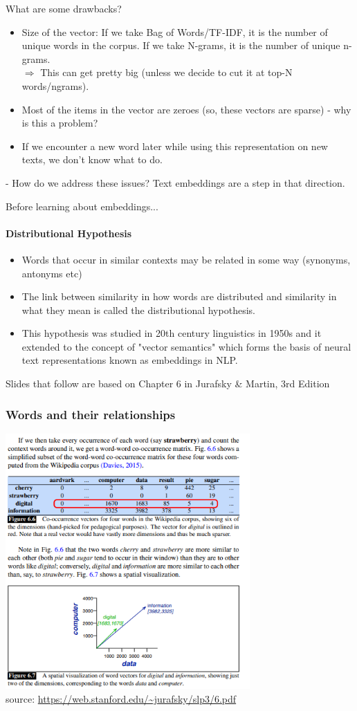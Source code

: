 \documentclass{beamer}
\begin{document}
\begin{frame}{What are some drawbacks?}
    \begin{itemize}
        \item Size of the vector: If we take Bag of Words/TF-IDF, it is the number of unique words in the corpus. If we take N-grams, it is the number of unique n-grams. 
        \\ $\Rightarrow$ This can get pretty big (unless we decide to cut it at top-N words/ngrams).
        \item Most of the items in the vector are zeroes (so, these vectors are sparse) - why is this a problem? \pause
        \item If we encounter a new word later while using this representation on new texts, we don't know what to do. \pause
    \end{itemize}
    -  How do we address these issues? \pause Text embeddings are a step in that direction. 
\end{frame}

\begin{frame}{Before learning about embeddings...}
\framesubtitle{Distributional Hypothesis}
    \begin{itemize}
        \item Words that occur in similar contexts may be related in some way (synonyms, antonyms etc)
        \item The link between similarity in how words are distributed and similarity
in what they mean is called the distributional hypothesis.
\item This hypothesis was studied in 20th century linguistics in 1950s and it extended to the concept of "vector semantics" which forms the basis of neural text representations known as embeddings in NLP. 
    \end{itemize}
    
    Slides that follow are based on Chapter 6 in Jurafsky \& Martin, 3rd Edition 
\end{frame}

\begin{frame}
\frametitle{Words and their relationships}
\includegraphics[width=0.7\textwidth]{figures/wordsvectors2.PNG}
\\ \tiny source: \url{https://web.stanford.edu/~jurafsky/slp3/6.pdf}
\end{frame}
\end{document}
